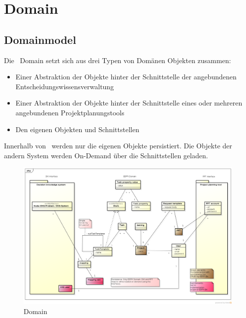 	\section{Domain}
		\subsection{Domainmodel}
			Die \eeppi\ Domain setzt sich aus drei Typen von Domänen Objekten zusammen: 
			\begin{itemize}
				\item Einer Abstraktion der Objekte hinter der Schnittstelle der angebundenen Entscheidungswissensverwaltung
				\item Einer Abstraktion der Objekte hinter der Schnittstelle eines oder mehreren angebundenen Projektplanungstools
				\item Den eigenen Objekten und Schnittstellen
			\end{itemize}
			
			Innerhalb von \eeppi\ werden nur die eigenen Objekte persistiert.
			Die Objekte der andern System werden On-Demand über die Schnittstellen geladen.
		
			\begin{landscape}
				\begin{figure}[H]
					\includegraphics[width=0.9\linewidth]{architecture/media/img/domain.png}
					\centering
					\caption{\eeppi Domain}
					\label{fig:domain}
				\end{figure}				
			\end{landscape}
			
